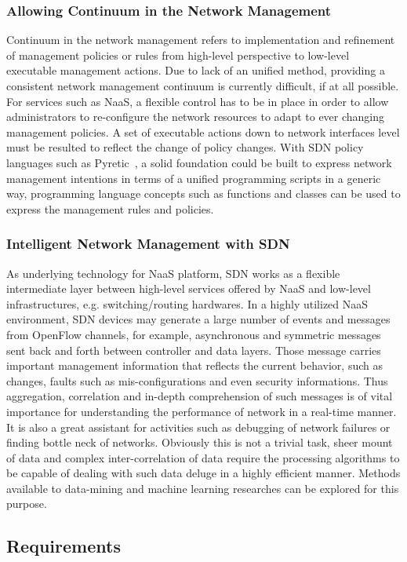 	\subsubsection{Allowing Continuum in the Network Management}

	Continuum in the network management refers to implementation and refinement
	of management policies or rules from high-level perspective to low-level
	executable management actions. Due to lack of an unified method, providing
	a consistent network management continuum is currently difficult, if at all
	possible. For services such as NaaS, a flexible control has to be in place
	in order to allow administrators to re-configure the network resources to
	adapt to ever changing management policies. A set of executable actions
	down to network interfaces level must be resulted to reflect the change of
	policy changes. With SDN policy languages such as Pyretic~\cite{pyretic}, a
	solid foundation could be built to express network management intentions
	in terms of a unified programming scripts in a generic way, programming
	language concepts such as functions and classes can be used to express the
	management rules and policies.


	\subsubsection{Intelligent Network Management with SDN}

	As underlying technology for NaaS platform, SDN works as a flexible
	intermediate layer between high-level services offered by NaaS and
	low-level infrastructures, e.g. switching/routing hardwares.  In a highly
	utilized NaaS environment, SDN devices may generate a large number of
	events and messages from OpenFlow channels, for example, asynchronous and
	symmetric messages sent back and forth between controller and data layers.
	Those message carries important management information that reflects the
	current behavior, such as changes, faults such as mis-configurations and
	even security informations. Thus aggregation, correlation and in-depth
	comprehension of such messages is of vital importance for understanding the
	performance of network in a real-time manner. It is also a great assistant
	for activities such as debugging of network failures or finding bottle neck
	of networks.  Obviously this is not a trivial task, sheer mount of data and
	complex inter-correlation of data require the processing algorithms to be
	capable of dealing with such data deluge in a highly efficient manner.
	Methods available to data-mining and machine learning researches can be
	explored for this purpose.
	
\subsection{Requirements}
